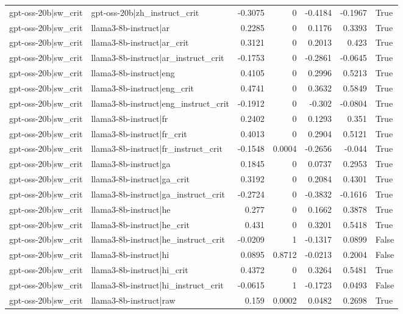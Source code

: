 \begin{table}
\begin{tabular}{l l r r r r l}
gpt-oss-20b|sw_crit & gpt-oss-20b|zh_instruct_crit & -0.3075 & 0 & -0.4184 & -0.1967 & True \\
gpt-oss-20b|sw_crit & llama3-8b-instruct|ar & 0.2285 & 0 & 0.1176 & 0.3393 & True \\
gpt-oss-20b|sw_crit & llama3-8b-instruct|ar_crit & 0.3121 & 0 & 0.2013 & 0.423 & True \\
gpt-oss-20b|sw_crit & llama3-8b-instruct|ar_instruct_crit & -0.1753 & 0 & -0.2861 & -0.0645 & True \\
gpt-oss-20b|sw_crit & llama3-8b-instruct|eng & 0.4105 & 0 & 0.2996 & 0.5213 & True \\
gpt-oss-20b|sw_crit & llama3-8b-instruct|eng_crit & 0.4741 & 0 & 0.3632 & 0.5849 & True \\
gpt-oss-20b|sw_crit & llama3-8b-instruct|eng_instruct_crit & -0.1912 & 0 & -0.302 & -0.0804 & True \\
gpt-oss-20b|sw_crit & llama3-8b-instruct|fr & 0.2402 & 0 & 0.1293 & 0.351 & True \\
gpt-oss-20b|sw_crit & llama3-8b-instruct|fr_crit & 0.4013 & 0 & 0.2904 & 0.5121 & True \\
gpt-oss-20b|sw_crit & llama3-8b-instruct|fr_instruct_crit & -0.1548 & 0.0004 & -0.2656 & -0.044 & True \\
gpt-oss-20b|sw_crit & llama3-8b-instruct|ga & 0.1845 & 0 & 0.0737 & 0.2953 & True \\
gpt-oss-20b|sw_crit & llama3-8b-instruct|ga_crit & 0.3192 & 0 & 0.2084 & 0.4301 & True \\
gpt-oss-20b|sw_crit & llama3-8b-instruct|ga_instruct_crit & -0.2724 & 0 & -0.3832 & -0.1616 & True \\
gpt-oss-20b|sw_crit & llama3-8b-instruct|he & 0.277 & 0 & 0.1662 & 0.3878 & True \\
gpt-oss-20b|sw_crit & llama3-8b-instruct|he_crit & 0.431 & 0 & 0.3201 & 0.5418 & True \\
gpt-oss-20b|sw_crit & llama3-8b-instruct|he_instruct_crit & -0.0209 & 1 & -0.1317 & 0.0899 & False \\
gpt-oss-20b|sw_crit & llama3-8b-instruct|hi & 0.0895 & 0.8712 & -0.0213 & 0.2004 & False \\
gpt-oss-20b|sw_crit & llama3-8b-instruct|hi_crit & 0.4372 & 0 & 0.3264 & 0.5481 & True \\
gpt-oss-20b|sw_crit & llama3-8b-instruct|hi_instruct_crit & -0.0615 & 1 & -0.1723 & 0.0493 & False \\
gpt-oss-20b|sw_crit & llama3-8b-instruct|raw & 0.159 & 0.0002 & 0.0482 & 0.2698 & True \\

\end{tabular}
\end{table}
